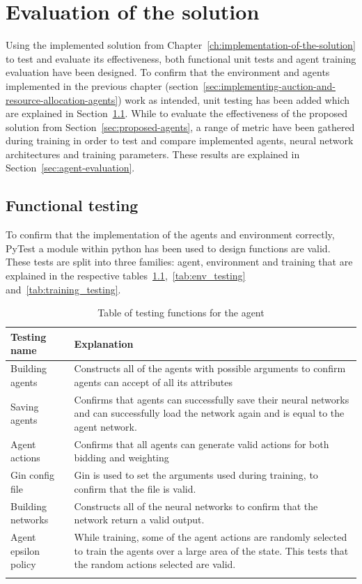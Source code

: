 
\chapter{Evaluation of the solution}\label{ch:evaluation-of-the-solution}
Using the implemented solution from Chapter~\ref{ch:implementation-of-the-solution} to test and evaluate its
effectiveness, both functional unit tests and agent training evaluation have been designed. To confirm that the
environment and agents implemented in the previous chapter
(section~\ref{sec:implementing-auction-and-resource-allocation-agents}) work as intended, unit testing has been added
which are explained in Section~\ref{sec:functional-testing}. While to evaluate the effectiveness of the proposed
solution from Section~\ref{sec:proposed-agents}, a range of metric have been gathered during training in order to
test and compare implemented agents, neural network architectures and training parameters. These results are explained
in Section~\ref{sec:agent-evaluation}.

\section{Functional testing}\label{sec:functional-testing}
To confirm that the implementation of the agents and environment correctly, PyTest a module within python has been used
to design functions are valid. These tests are split into three families: agent, environment and training that are
explained in the respective tables~\ref{tab:agent_testing},~\ref{tab:env_testing} and~\ref{tab:training_testing}.

\begin{longtable}{|p{3cm}|p{11cm}|} \hline
    \textbf{Testing name} & \textbf{Explanation} \\ \hline
    Building agents & Constructs all of the agents with possible arguments to confirm agents can accept of all its
        attributes\\ \hline
    Saving agents & Confirms that agents can successfully save their neural networks and can successfully load
        the network again and is equal to the agent network. \\ \hline
    Agent actions & Confirms that all agents can generate valid actions for both bidding and weighting \\ \hline
    Gin config file & Gin is used to set the arguments used during training, to confirm that the file is valid. \\ \hline
    Building networks & Constructs all of the neural networks to confirm that the network return a valid output. \\ \hline
    Agent epsilon policy & While training, some of the agent actions are randomly selected to train the agents over
        a large area of the state. This tests that the random actions selected are valid. \\ \hline
    \caption{Table of testing functions for the agent}
    \label{tab:agent_testing}
\end{longtable}

